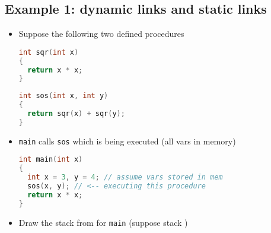 \documentclass[10pt,a4paper,landscape]{article}
\begin{document}
\begin{multicols*}{3}
\section*{Example 1: dynamic links and static links}
\begin{itemize}
\item Suppose the following two  defined procedures
\begin{minipage}{.5\linewidth}
\begin{lstlisting}[language=c]
int sqr(int x)
{
  return x * x;
}
\end{lstlisting}
\end{minipage}
\begin{minipage}{.5\linewidth}
\begin{lstlisting}[language=c,xleftmargin=2pt]
int sos(int x, int y)
{
  return sqr(x) + sqr(y);
}
\end{lstlisting}
\end{minipage}
\item \texttt{main} calls \texttt{sos} which is being executed (all vars in memory)
\begin{lstlisting}[language=c]
int main(int x)
{
  int x = 3, y = 4; // assume vars stored in mem
  sos(x, y); // <-- executing this procedure
  return x * x;
}
\end{lstlisting}
\item Draw the stack from for \texttt{main} (suppose stack )
\begin{minipage}{\linewidth}
  \centering
\end{minipage}
\end{itemize}
\end{multicols*}
\end{document}

